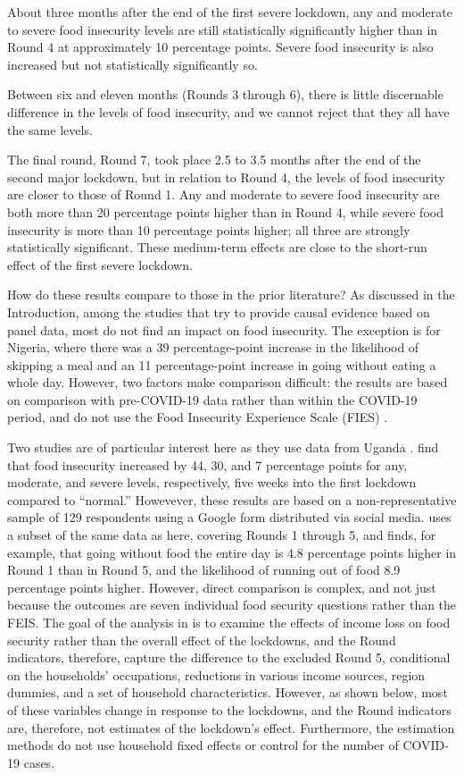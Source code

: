 \documentclass{wber}
\begin{document}
About three months after the end of the first severe lockdown, any and
moderate to severe food insecurity levels are still statistically
significantly higher than in Round 4 at approximately 10 percentage
points. Severe food insecurity is also increased but not statistically
significantly so.

Between six and eleven months (Rounds 3 through 6), there is little
discernable difference in the levels of food insecurity, and we cannot
reject that they all have the same levels.

The final round, Round 7, took place 2.5 to 3.5 months after the end of
the second major lockdown, but in relation to Round 4, the levels of
food insecurity are closer to those of Round 1. Any and moderate to
severe food insecurity are both more than 20 percentage points higher
than in Round 4, while severe food insecurity is more than 10 percentage
points higher; all three are strongly statistically significant. These
medium-term effects are close to the short-run effect of the first
severe lockdown.

How do these results compare to those in the prior literature? As
discussed in the Introduction, among the studies that try to provide
causal evidence based on panel data, most do not find an impact on food
insecurity. The exception is for Nigeria, where there was a 39
percentage-point increase in the likelihood of skipping a meal and an 11
percentage-point increase in going without eating a whole day. However,
two factors make comparison difficult: the results are based on
comparison with pre-COVID-19 data rather than within the COVID-19
period, and do not use the Food Insecurity Experience Scale (FIES)
\citep{Amare2021}.

Two studies are of particular interest here as they use data from Uganda
\citep{Kansiime2021, Agamile2022}. \citet{Kansiime2021} find that food
insecurity increased by 44, 30, and 7 percentage points for any,
moderate, and severe levels, respectively, five weeks into the first
lockdown compared to ``normal.'' Howevever, these results are based on a
non-representative sample of 129 respondents using a Google form
distributed via social media. \citet{Agamile2022} uses a subset of the
same data as here, covering Rounds 1 through 5, and finds, for example,
that going without food the entire day is 4.8 percentage points higher
in Round 1 than in Round 5, and the likelihood of running out of food
8.9 percentage points higher. However, direct comparison is complex, and
not just because the outcomes are seven individual food security
questions rather than the FEIS. The goal of the analysis in
\citet{Agamile2022} is to examine the effects of income loss on food
security rather than the overall effect of the lockdowns, and the Round
indicators, therefore, capture the difference to the excluded Round 5,
conditional on the households' occupations, reductions in various income
sources, region dummies, and a set of household characteristics.
However, as shown below, most of these variables change in response to
the lockdowns, and the Round indicators are, therefore, not estimates of
the lockdown's effect. Furthermore, the estimation methods do not use
household fixed effects or control for the number of COVID-19 cases.
\end{document}
